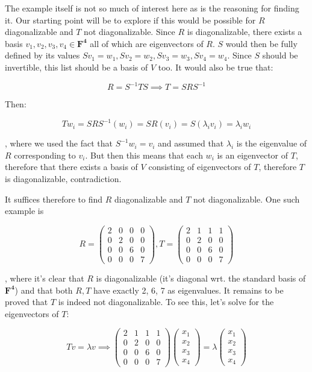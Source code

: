 \begin{solution}

The example itself is not so much of interest here as is the reasoning for finding it. Our starting point will be to explore if this would be possible for $R$ diagonalizable and $T$ not diagonalizable. Since $R$ is diagonalizable, there exists a basis $v_1, v_2, v_3, v_4 \in \mathbf{F^4}$ all of which are eigenvectors of $R$. $S$ would then be fully defined by its values $Sv_1 = w_1, Sv_2 = w_2, Sv_3 = w_3, Sv_4 = w_4$. Since $S$ should be invertible, this list should be a basis of $V$ too. It would also be true that:

$$R = S^{-1}TS \implies T = SRS^{-1}$$

Then:

$$Tw_i = SRS^{-1}(w_i) = SR(v_i) = S(\lambda_i v_i) = \lambda_i w_i$$

, where we used the fact that $S^{-1}w_i = v_i$ and assumed that $\lambda_i$ is the eigenvalue of $R$ corresponding to $v_i$. But then this means that each $w_i$ is an eigenvector of $T$, therefore that there exists a basis of $V$ consisting of eigenvectors of $T$, therefore $T$ is diagonalizable, contradiction.

It suffices therefore to find $R$ diagonalizable and $T$ not diagonalizable. One such example is

$$R = \begin{pmatrix} 2 & 0 & 0 & 0 \\ 0 & 2 & 0 & 0 \\ 0 & 0 & 6 & 0 \\ 0 & 0 & 0 & 7 \end{pmatrix}, T = \begin{pmatrix} 2 & 1 & 1 & 1 \\ 0 & 2 & 0 & 0 \\ 0 & 0 & 6 & 0 \\ 0 & 0 & 0 & 7 \end{pmatrix}$$

, where it's clear that $R$ is diagonalizable (it's diagonal wrt. the standard basis of $\mathbf{F^4}$) and that both $R, T$ have exactly 2, 6, 7 as eigenvalues. It remains to be proved that $T$ is indeed not diagonalizable. To see this, let's solve for the eigenvectors of $T$:

$$Tv = \lambda v \implies \begin{pmatrix} 2 & 1 & 1 & 1 \\ 0 & 2 & 0 & 0 \\ 0 & 0 & 6 & 0 \\ 0 & 0 & 0 & 7 \end{pmatrix} 
\begin{pmatrix} x_1 \\ x_2 \\ x_3 \\ x_4 \end{pmatrix} = \lambda \begin{pmatrix} x_1 \\ x_2 \\ x_3 \\ x_4 \end{pmatrix} $$


\end{solution}
